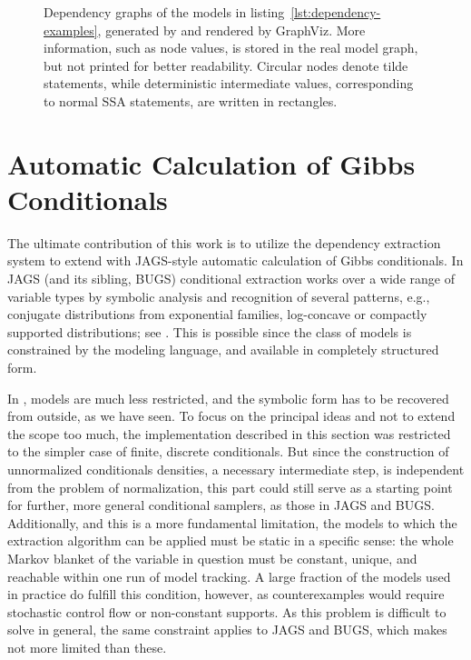 \begin{figure}[p]
  \caption{Dependency graphs of the models in listing~\ref{lst:dependency-examples}, generated by
    \autogibbsjl{} and rendered by GraphViz.  More information, such as node values, is stored in
    the real model graph, but not printed for better readability.  Circular nodes denote tilde
    statements, while deterministic intermediate values, corresponding to normal SSA statements, are
    written in rectangles.}
  \label{fig:geom-deps}
\end{figure}


\section{Automatic Calculation of Gibbs Conditionals}
\label{sec:automatic-conditionals}

The ultimate contribution of this work is to utilize the dependency extraction system to extend
\turingjl{} with JAGS-style automatic calculation of Gibbs conditionals.  In JAGS (and its sibling,
BUGS) conditional extraction works over a wide range of variable types \parencite{plummer2003jags}
by symbolic analysis and recognition of several patterns, e.g., conjugate distributions from
exponential families, log-concave or compactly supported distributions; see
\textcite{lunn2000winbugs}.  This is possible since the class of models is constrained by the
modeling language, and available in completely structured form.

In \turingjl{}, models are much less restricted, and the symbolic form has to be recovered from
outside, as we have seen.  To focus on the principal ideas and not to extend the scope too much, the
implementation described in this section was restricted to the simpler case of finite, discrete
conditionals.  But since the construction of unnormalized conditionals densities, a necessary
intermediate step, is independent from the problem of normalization, this part could still serve as
a starting point for further, more general conditional samplers, as those in JAGS and BUGS.
Additionally, and this is a more fundamental limitation, the models to which the extraction
algorithm can be applied must be static in a specific sense: the whole Markov blanket of the
variable in question must be constant, unique, and reachable within one run of model tracking.  A
large fraction of the models used in practice do fulfill this condition, however, as counterexamples
would require stochastic control flow or non-constant supports.  As this problem is difficult to
solve in general, the same constraint applies to JAGS and BUGS, which makes \autogibbsjl{} not more
limited than these.

